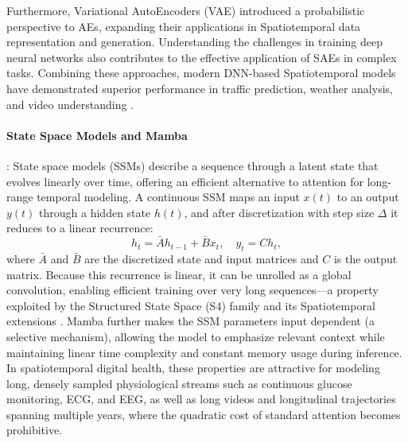 \documentclass[acmsmall]{acmart}
\begin{document}
Furthermore, Variational AutoEncoders (VAE) \cite{kingma2013auto} introduced a probabilistic perspective to AEs, expanding their applications in Spatiotemporal data representation and generation. Understanding the challenges in training deep neural networks \cite{glorot2010understanding} also contributes to the effective application of SAEs in complex tasks. Combining these approaches, modern DNN-based Spatiotemporal models have demonstrated superior performance in traffic prediction, weather analysis, and video understanding \cite{zhang2017deep, yu2018spatio}.

\paragraph{State Space Models and Mamba}: State space models (SSMs) describe a sequence through a latent state that evolves linearly over time, offering an efficient alternative to attention for long-range temporal modeling. A continuous SSM maps an input $x(t)$ to an output $y(t)$ through a hidden state $h(t)$, and after discretization with step size $\Delta$ it reduces to a linear recurrence:
\begin{equation}
h_t = \bar{A} h_{t-1} + \bar{B} x_t, \quad y_t = C h_t,
\end{equation}
where $\bar{A}$ and $\bar{B}$ are the discretized state and input matrices and $C$ is the output matrix. Because this recurrence is linear, it can be unrolled as a global convolution, enabling efficient training over very long sequences---a property exploited by the Structured State Space (S4) family and its Spatiotemporal extensions \cite{smith2023convssm}. Mamba \cite{gu2023mamba} further makes the SSM parameters input dependent (a selective mechanism), allowing the model to emphasize relevant context while maintaining linear time complexity and constant memory usage during inference. In spatiotemporal digital health, these properties are attractive for modeling long, densely sampled physiological streams such as continuous glucose monitoring, ECG, and EEG, as well as long videos and longitudinal trajectories spanning multiple years, where the quadratic cost of standard attention becomes prohibitive.
\end{document}
